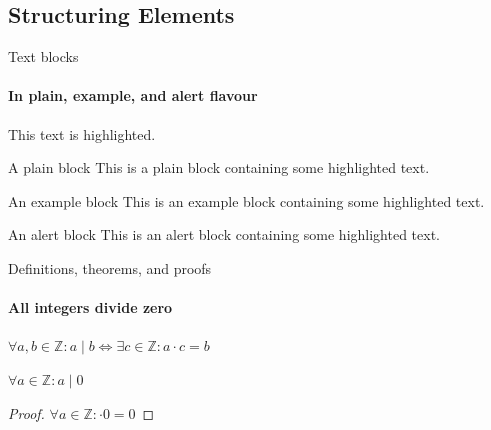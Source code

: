\documentclass[aspectratio=169]{beamer}
\begin{document}
\subsection{Structuring Elements}
    \begin{frame}[label=simmonshall]{Text blocks}
      \framesubtitle{In plain, example, and \alert{alert} flavour}
      \alert{This text} is highlighted.

      \begin{block}{A plain block}
        This is a plain block containing some \alert{highlighted text}.
      \end{block}
      \begin{exampleblock}{An example block}
        This is an example block containing some \alert{highlighted text}.
      \end{exampleblock}
      \begin{alertblock}{An alert block}
        This is an alert block containing some \alert{highlighted text}.
      \end{alertblock}
    \end{frame}


\begin{frame}[label=proof]{Definitions, theorems, and proofs}
      \framesubtitle{All integers divide zero}
      \begin{definition}
        $\forall a,b\in\mathds{Z}: a\mid b\iff\exists c\in\mathds{Z}:a\cdot c=b$
      \end{definition}
      \begin{theorem}
        $\forall a\in\mathds{Z}: a\mid 0$
      \end{theorem}
      \begin{proof}[Proof\nopunct]
      	$\forall a\in \mathds{Z}:\cdot 0=0$
      \end{proof}
\end{frame}
\end{document}
